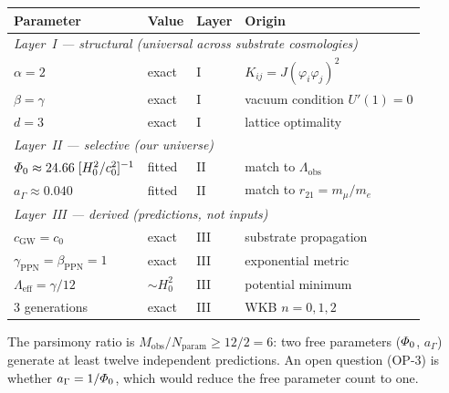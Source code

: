 \begin{center}\small
\begin{tabular}{@{}llll@{}}
\toprule
\textbf{Parameter} & \textbf{Value} & \textbf{Layer} & \textbf{Origin} \\
\midrule
\multicolumn{4}{l}{\textit{Layer~I --- structural (universal across substrate cosmologies)}} \\
$\alpha=2$  & exact & I & $K_{ij}=J(\varphi_{i}\varphi_{j})^{2}$ \\
$\beta=\gamma$ & exact & I & vacuum condition $U'(1)=0$ \\
$d=3$ & exact & I & lattice optimality \\
\midrule
\multicolumn{4}{l}{\textit{Layer~II --- selective (our universe)}} \\
$\varPhi_0 \approx 24.66\;[H_{0}^{2}/c_{0}^{2}]^{-1}$
  & fitted & II & match to $\Lambda_{\mathrm{obs}}$ \\
$a_{\Gamma}\approx 0.040$ & fitted & II & match to $r_{21}=m_{\mu}/m_{e}$ \\
\midrule
\multicolumn{4}{l}{\textit{Layer~III --- derived (predictions, not inputs)}} \\
$c_{\mathrm{GW}}=c_{0}$ & exact & III & substrate propagation \\
$\gamma_{\mathrm{PPN}}=\beta_{\mathrm{PPN}}=1$ & exact & III & exponential metric \\
$\Lambda_{\mathrm{eff}}=\gamma/12$ & $\sim H_{0}^{2}$ & III & potential minimum \\
3 generations & exact & III & WKB $n=0,1,2$ \\
\bottomrule
\end{tabular}
\end{center}

\noindent
The parsimony ratio is $M_{\mathrm{obs}}/N_{\mathrm{param}}\geq 12/2 = 6$:
two free parameters ($\varPhi_0$, $a_{\Gamma}$) generate at least
twelve independent predictions.  An open question (OP-3) is whether
$a_{\Gamma}=1/\varPhi_0$, which would reduce the free parameter count
to one.

